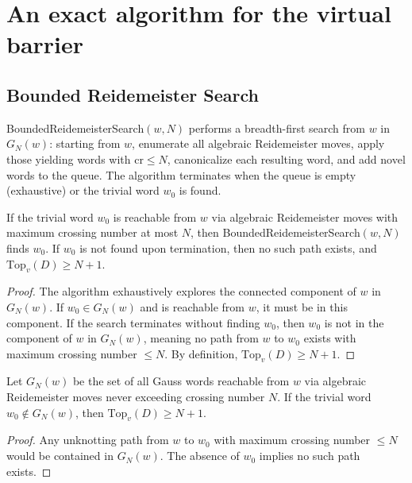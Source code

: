 \documentclass[a4paper,UKenglish,cleveref,autoref]{lipics-v2021}
\newcommand{\BRS}{\textsf{Bounded\-Reide\-meister\-Search}\xspace}
\begin{document}
\section{An exact algorithm for the virtual barrier}

\subsection{Bounded Reidemeister Search}

\begin{definition}
\BRS$(w, N)$ performs a breadth-first search from $w$ in $G_N(w)$: starting from $w$, enumerate all algebraic Reidemeister moves, apply those yielding words with $\mathrm{cr} \leq N$, canonicalize each resulting word, and add novel words to the queue.
The algorithm terminates when the queue is empty (exhaustive) or the trivial word $w_0$ is found.
\end{definition}

\begin{theorem}[Correctness]\label{thm:correctness}
If the trivial word $w_0$ is reachable from $w$ via algebraic Reidemeister moves with maximum crossing number at most $N$, then \BRS$(w, N)$ finds $w_0$.
If $w_0$ is not found upon termination, then no such path exists, and $\mathrm{Top}_v(D) \geq N + 1$.
\end{theorem}

\begin{proof}
The algorithm exhaustively explores the connected component of $w$ in $G_N(w)$.
If $w_0 \in G_N(w)$ and is reachable from $w$, it must be in this component.
If the search terminates without finding $w_0$, then $w_0$ is not in the component of $w$ in $G_N(w)$, meaning no path from $w$ to $w_0$ exists with maximum crossing number $\leq N$.
By definition, $\mathrm{Top}_v(D) \geq N + 1$.
\end{proof}

\begin{lemma}\label{lem:lower}
Let $G_N(w)$ be the set of all Gauss words reachable from $w$ via algebraic Reidemeister moves never exceeding crossing number $N$.
If the trivial word $w_0 \notin G_N(w)$, then $\mathrm{Top}_v(D) \geq N + 1$.
\end{lemma}

\begin{proof}
Any unknotting path from $w$ to $w_0$ with maximum crossing number $\leq N$ would be contained in $G_N(w)$.
The absence of $w_0$ implies no such path exists.
\end{proof}
\end{document}
